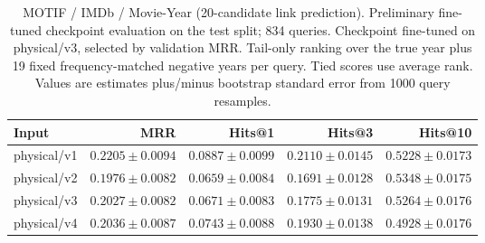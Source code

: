 \begin{table}[t]
\centering
\small
\begin{tabular}{lrrrr}
\toprule
Input & MRR & Hits@1 & Hits@3 & Hits@10 \\
\midrule
physical/v1 & $0.2205 \pm 0.0094$ & $0.0887 \pm 0.0099$ & $0.2110 \pm 0.0145$ & $0.5228 \pm 0.0173$ \\
physical/v2 & $0.1976 \pm 0.0082$ & $0.0659 \pm 0.0084$ & $0.1691 \pm 0.0128$ & $0.5348 \pm 0.0175$ \\
physical/v3 & $0.2027 \pm 0.0082$ & $0.0671 \pm 0.0083$ & $0.1775 \pm 0.0131$ & $0.5264 \pm 0.0176$ \\
physical/v4 & $0.2036 \pm 0.0087$ & $0.0743 \pm 0.0088$ & $0.1930 \pm 0.0138$ & $0.4928 \pm 0.0176$ \\
\bottomrule
\end{tabular}
\caption{MOTIF / IMDb / Movie-Year (20-candidate link prediction). Preliminary fine-tuned checkpoint evaluation on the test split; 834 queries. Checkpoint fine-tuned on physical/v3, selected by validation MRR. Tail-only ranking over the true year plus 19 fixed frequency-matched negative years per query. Tied scores use average rank. Values are estimates plus/minus bootstrap standard error from 1000 query resamples.}
\label{tab:motif-movie_year-link_prediction}
\end{table}
